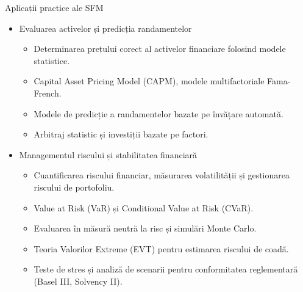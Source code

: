 \documentclass[9pt, aspectratio=169, t]{beamer}
\theoremstyle{definition}
\begin{document}
\begin{frame}{Aplicații practice ale SFM}
\begin{itemize}
    \item Evaluarea activelor și predicția randamentelor
    \begin{itemize}
        \item Determinarea prețului corect al activelor financiare folosind modele statistice.
        \item Capital Asset Pricing Model (CAPM), modele multifactoriale Fama-French.
        \item Modele de predicție a randamentelor bazate pe învățare automată.
        \item Arbitraj statistic și investiții bazate pe factori.
    \end{itemize}
    \item Managementul riscului și stabilitatea financiară
    \begin{itemize}
        \item Cuantificarea riscului financiar, măsurarea volatilității și gestionarea riscului de portofoliu.
        \item Value at Risk (VaR) și Conditional Value at Risk (CVaR).
        \item Evaluarea în măsură neutră la risc și simulări Monte Carlo.
        \item Teoria Valorilor Extreme (EVT) pentru estimarea riscului de coadă.
        \item Teste de stres și analiză de scenarii pentru conformitatea reglementară (Basel III, Solvency II).
    \end{itemize}
\end{itemize}
\end{frame}
\end{document}

